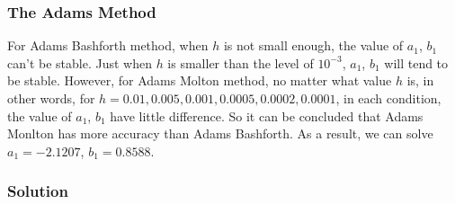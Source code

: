 \documentclass[a4paper]{article}
\begin{document}
	\subsubsection{The Adams Method}
	
	For Adams Bashforth method, when $h$ is not small enough, the value of $a_1$, $b_1$ can’t be stable. Just when $h$ is smaller than the level of $10^{-3}$, $a_1$, $b_1$ will tend to be stable. However, for Adams Molton method, no matter what value $h$ is, in other words, for $h=0.01,0.005,0.001,0.0005,0.0002,0.0001$, in each condition, the value of $a_1$, $b_1$ have little difference. So it can be concluded that Adams Monlton has more accuracy than Adams Bashforth. As a result, we can solve $a_1=-2.1207$, $b_1=0.8588$.
	
	\begin{table}[H]
		\centering
		\caption{Using Adams Method to Determine t When y is infinity}
		\label{tab:adams_inf}
	\end{table}
	
	\subsubsection{Solution}
	
\end{document}
